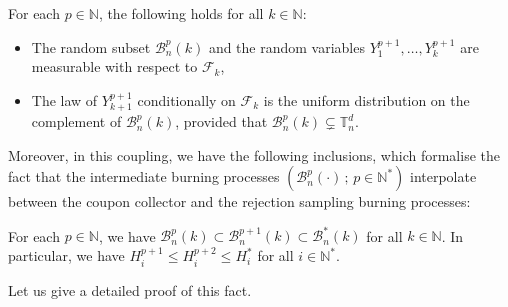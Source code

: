 \documentclass[a4paper,11pt]{article}
\begin{document}
\begin{claim}\label{claim:rejectionsamplingp}
For each $p\in\mathbb{N}$, the following holds for all $k\in\mathbb{N}$:
\begin{itemize}
\item The random subset $\mathcal{B}_n^p(k)$ and the random variables $Y_1^{p+1},\ldots,Y_k^{p+1}$ are measurable with respect to $\mathcal{F}_k$,

\item The law of $Y_{k+1}^{p+1}$ conditionally on $\mathcal{F}_k$ is the uniform distribution on the complement of $\mathcal{B}_n^p(k)$, provided that ${\mathcal{B}_n^p(k)\varsubsetneq\mathbb{T}_n^d}$.
\end{itemize}
\end{claim}

Moreover, in this coupling, we have the following inclusions, which formalise the fact that the intermediate burning processes $\left(\mathcal{B}_n^p(\cdot)\,;\,p\in\mathbb{N}^*\right)$ interpolate between the coupon collector and the rejection sampling burning processes:

\begin{claim}\label{claim:inclusionintermediate}
For each $p\in\mathbb{N}$, we have $\mathcal{B}_n^p(k)\subset\mathcal{B}_n^{p+1}(k)\subset\mathcal{B}_n^*(k)$ for all $k\in\mathbb{N}$.
In particular, we have $H_i^{p+1}\leq H_i^{p+2}\leq H_i^*$ for all $i\in\mathbb{N}^*$.
\end{claim}

Let us give a detailed proof of this fact.
\end{document}
